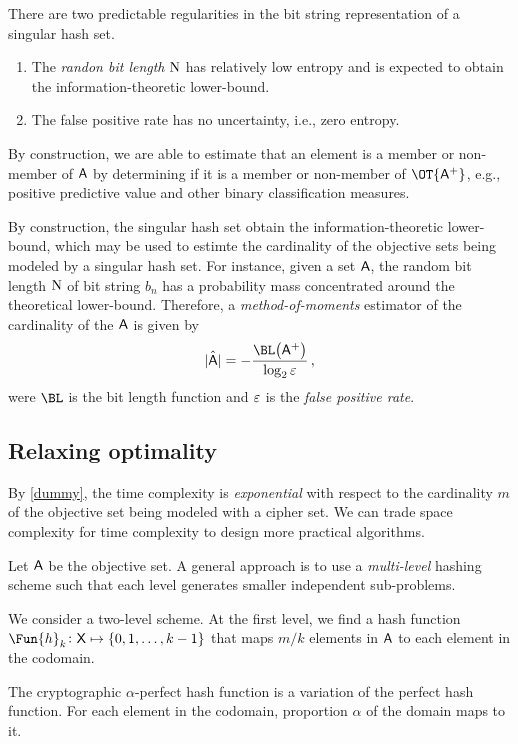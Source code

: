 \documentclass[ ../main.tex]{subfiles}
\begin{document}
There are two predictable regularities in the bit string representation of a singular hash set.
\begin{enumerate}
	\item The \emph{randon bit length} $\mathrm{N}$ has relatively low entropy and is expected to obtain the information-theoretic lower-bound.
	\item The false positive rate has no uncertainty, i.e., zero entropy.
\end{enumerate}

By construction, we are able to estimate that an element is a member or non-member of $\Set{A}$ by determining if it is a member or non-member of $\OT{\PASet{A}}$, e.g., positive predictive value and other binary classification measures.

By construction, the singular hash set obtain the information-theoretic lower-bound, which may be used to estimte the cardinality of the objective sets being modeled by a singular hash set.
For instance, given a set $\Set{A}$, the random bit length $\mathrm{N}$ of bit string $b_n$ has a probability mass concentrated around the theoretical lower-bound.
Therefore, a \emph{method-of-moments} estimator of the cardinality of the $\Set{A}$ is given by
\begin{equation}
    \hat{\Card{\Set{A}}} = -\frac{\BL\!\left(\PASet{A}\right)}{\log_2 \fprate}\,,
\end{equation}
were $\BL$ is the bit length function and $\varepsilon$ is the \emph{false positive rate}.




\subsection{Relaxing optimality}
By \cref{dummy}, the time complexity is \emph{exponential} with respect to the cardinality $m$ of the objective set being modeled with a cipher set.
We can trade space complexity for time complexity to design more practical algorithms.

Let $\Set{A}$ be the objective set.
A general approach is to use a \emph{multi-level} hashing scheme such that each level generates smaller independent sub-problems.

We consider a two-level scheme.
At the first level, we find a hash function $\Fun{h}_k \colon \Set{X} \mapsto \{0,1,\ldots,k-1\}$ that maps $m/k$ elements in $\Set{A}$ to each element in the codomain.

\begin{definition}
The cryptographic $\alpha$-perfect hash function is a variation of the perfect hash function.
For each element in the codomain, proportion $\alpha$ of the domain maps to it.
\end{definition}
\end{document}
